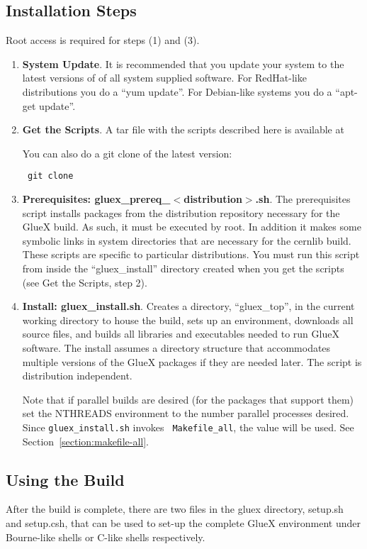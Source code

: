 \documentclass[12pt, letterpaper]{article}
\begin{document}
\subsection{Installation Steps}

Root access is required for steps (1) and (3).

\begin{enumerate}

\item {\bf System Update}. It is recommended that you update your
  system to the latest versions of of all system supplied
  software. For RedHat-like distributions you do a ``yum update''. For
  Debian-like systems you do a ``apt-get update''.

\item {\bf Get the Scripts}. A tar file with the scripts described
  here is available at
  \begin{center}
  \end{center}
You can also do a git clone of the latest version:
\begin{center}\tt
  git clone 
\end{center}

\item {\bf Prerequisites: gluex\_prereq\_$<$distribution$>$.sh}. The
  prerequisites script installs packages from the distribution
  repository necessary for the GlueX build. As such, it must be
  executed by root. In addition it makes some symbolic links in system
  directories that are necessary for the cernlib build. These scripts
  are specific to particular distributions. You must run this
  script from inside the ``gluex\_install'' directory created when you
  get the scripts (see Get the Scripts, step 2).

\item {\bf Install: gluex\_install.sh}. Creates a directory,
  ``gluex\_top'', in the current working directory to house the build,
  sets up an environment, downloads all source files, and builds all
  libraries and executables needed to run GlueX software. The install
  assumes a directory structure that accommodates multiple versions of
  the GlueX packages if they are needed later. The script is
  distribution independent.

  Note that if parallel builds are desired (for the packages that
  support them) set the NTHREADS environment to the number parallel
  processes desired. Since {\tt gluex\_install.sh} invokes {\tt
    Makefile\_all}, the value will be used. See
  Section\ \ref{section:makefile-all}.

\end{enumerate}

\subsection{Using the Build}

After the build is complete, there are two files in the gluex
directory, setup.sh and setup.csh, that can be used to set-up the
complete GlueX environment under Bourne-like shells or C-like shells
respectively.
\end{document}
